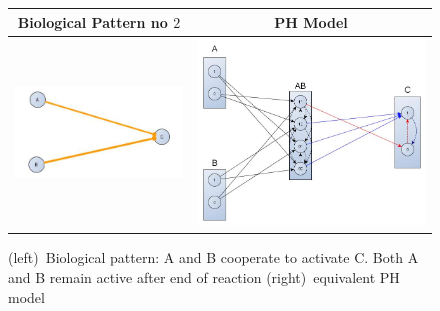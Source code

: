 \documentclass[11pt,a4paper,twoside]{epig}
\begin{document}
\begin{figure}[ht]
\begin{tabular}{|c|c|}
\hline
Biological Pattern no $2$ & PH Model \\
\hline
  \includegraphics[scale=0.3]{./imagesannexe/phdrawings/2cyt.jpg} & \includegraphics[scale=0.15]{./imagesannexe/phdrawings/2ph.jpg} \\
 \hline
 
\end{tabular}
\caption{\label{fig:pattern:2}
(left)~Biological pattern: A and B cooperate to activate C. Both A and B remain active after end of reaction
(right)~equivalent PH model
}
\end{figure}
\end{document}

